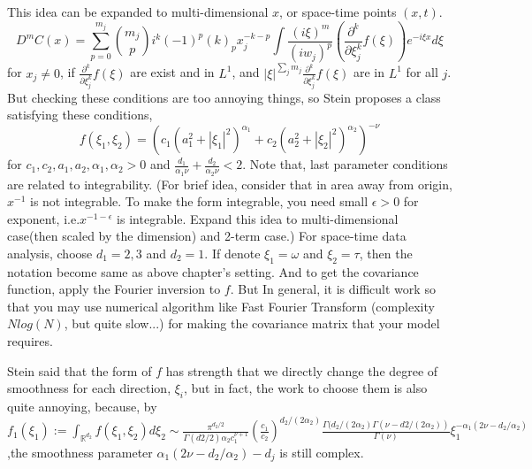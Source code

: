 \documentclass{article}
\begin{document}
{This idea can be expanded to multi-dimensional $x$, or space-time points $(x,t)$.
\[D^mC(x)=\sum_{p=0}^{m_j}\binom{m_j}{p}i^k (-1)^p (k)_p x_j^{-k-p}\int \frac{(i\xi)^m}{(iw_j)^p}(\frac{\partial^k}{\partial \xi_j^k}f(\xi))e^{-i\xi x}d\xi\]
for $x_j \neq 0$, if $\frac{\partial^k}{\partial \xi_j^k}f(\xi)$ are exist and in $L^1$, and $|\xi|^{\sum_j m_j}\frac{\partial^k}{\partial \xi_j^k}f(\xi)$ are in $L^1$ for all $j$.
But checking these conditions are too annoying things, so Stein proposes a class satisfying these conditions,
\[f(\xi_1,\xi_2)=(c_1(a_1^2+|\xi_1|^2)^{\alpha_1} + c_2(a_2^2+|\xi_2|^2)^{\alpha_2})^{-\nu}\]
for $c_1,c_2,a_1,a_2,\alpha_1,\alpha_2>0$ and $\frac{d_1}{\alpha_1\nu}+\frac{d_2}{\alpha_2\nu}<2$.
Note that, last parameter conditions are related to integrability. (For brief idea, consider that in area away from origin,
$x^{-1}$ is not integrable. To make the form integrable, you need small $\epsilon>0$ for exponent, i.e.$x^{-1-\epsilon}$ is integrable.
Expand this idea to multi-dimensional case(then scaled by the dimension) and 2-term case.)
For space-time data analysis, choose $d_1=2,3$ and $d_2=1$. If denote $\xi_1=\omega$ and $\xi_2=\tau$, then the notation become same as above chapter's setting.
And to get the covariance function, apply the Fourier inversion to $f$.
But In general, it is difficult work so that you may use numerical algorithm like Fast Fourier Transform (complexity $Nlog(N)$, but quite slow...) for making the covariance matrix that your model requires.

Stein said that the form of $f$ has strength that we directly change the degree of smoothness for each direction, $\xi_i$,
but in fact, the work to choose them is also quite annoying, because, by
\(f_1(\xi_1):=\int_{\mathbb R^{d_2}} f(\xi_1,\xi_2)d\xi_2 \sim 
\frac{\pi^{d_2/2}}{\Gamma(d2/2)\alpha_2c_1^{\nu+1}} (\frac{c_1}{c_2})^{d_2/(2\alpha_2)} \frac{\Gamma(d_2/(2\alpha_2)\Gamma(\nu-d2/(2\alpha_2))}{\Gamma(\nu)}\xi_1^{-\alpha_1(2\nu-d_2/\alpha_2)} \)
,the smoothness parameter $\alpha_1(2\nu-d_2/\alpha_2)-d_j$ is still complex.

}
\end{document}

